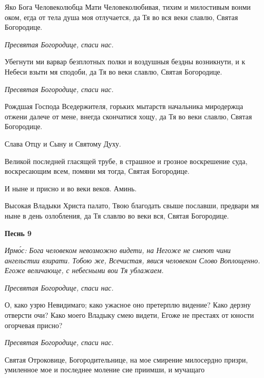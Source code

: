    Яко Бога Человеколюбца Мати Человеколюбивая, тихим и милостивым
вонми оком, егда от тела душа моя отлучается, да Тя во вся веки славлю,
Святая Богородице.



 \itshape  Пресвятая Богородице, спаси нас.
\normalfont{}


   Убегнути ми варвар безплотных полки и воздушныя бездны возникнути,
и к Небеси взыти мя сподоби, да Тя во веки славлю, Святая Богородице.



 \itshape  Пресвятая Богородице, спаси нас.
\normalfont{}


   Рождшая Господа Вседержителя, горьких мытарств начальника
миродержца отжени далече от мене, внегда скончатися хощу, да Тя во веки
славлю, Святая Богородице.



   Слава Отцу и Сыну и Святому Духу.



   Великой последней гласящей трубе, в страшное и грозное воскрешение
суда, воскресающим всем, помяни мя тогда, Святая Богородице.



   И ныне и присно и во веки веков. Аминь.



   Высокая Владыки Христа палато, Твою благодать свыше пославши,
предвари мя ныне в день озлобления, да Тя славлю во веки вся, Святая
Богородице.



 

\bfseries Песнь 9\normalfont{}


 \itshape Ирмо́с:\normalfont{} Бога человеком невозможно видети, на Негоже не смеют чини
ангельстии взирати. Тобою же, Всечистая, явися человеком Слово Воплощенно.
Егоже величающе, с небесными вои Тя ублажаем.



 \itshape  Пресвятая Богородице, спаси нас.
\normalfont{}


   О, како узрю Невидимаго; како ужасное оно претерплю видение? Како
дерзну отверсти очи? Како моего Владыку смею видети, Егоже не престаях
от юности огорчевая присно?



 \itshape  Пресвятая Богородице, спаси нас.
\normalfont{}


   Святая Отроковице, Богородительнице, на мое смирение милосердно
призри, умиленное мое и последнее моление сие приимши, и мучащаго

